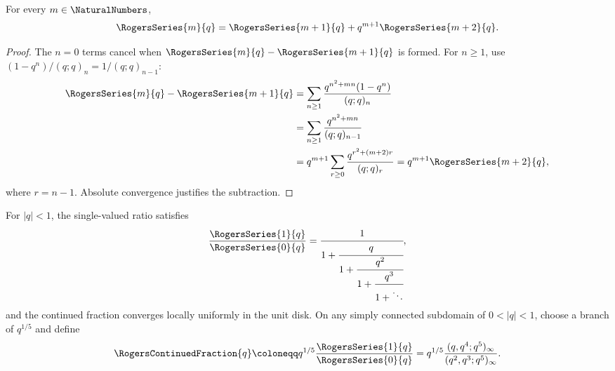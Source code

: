 \begin{lemma}
\label{qg:lem-rogers-recurrence}
For every \(m\in\NaturalNumbers\),
\begin{equation}
  \RogersSeries{m}{q}
  =\RogersSeries{m+1}{q}+q^{m+1}\RogersSeries{m+2}{q}.
  \label{qg:eq:rogers-recurrence}
\end{equation}
\end{lemma}

\begin{proof}
The \(n=0\) terms cancel when
\(\RogersSeries{m}{q}-\RogersSeries{m+1}{q}\) is formed.  For
\(n\ge1\), use
\((1-q^n)/(q;q)_n=1/(q;q)_{n-1}\):
\begin{align*}
 \RogersSeries{m}{q}-\RogersSeries{m+1}{q}
 &=\sum_{n\ge1}
   \frac{q^{n^2+mn}(1-q^n)}{(q;q)_n}\\
 &=\sum_{n\ge1}\frac{q^{n^2+mn}}{(q;q)_{n-1}}\\
 &=q^{m+1}\sum_{r\ge0}
   \frac{q^{r^2+(m+2)r}}{(q;q)_r}
 =q^{m+1}\RogersSeries{m+2}{q},
\end{align*}
where \(r=n-1\).  Absolute convergence justifies the subtraction.
\end{proof}

\begin{theorem}
\label{qg:thm-rrcf}
For \(|q|<1\), the single-valued ratio satisfies
\begin{equation}
 \frac{\RogersSeries{1}{q}}{\RogersSeries{0}{q}}
 =
 \cfrac{1}{
  1+\cfrac{q}{
  1+\cfrac{q^2}{
  1+\cfrac{q^3}{1+\ddots}}}},
 \label{qg:eq:rogers-ramanujan-fraction}
\end{equation}
and the continued fraction converges locally uniformly in the unit disk.
On any simply connected subdomain of \(0<|q|<1\), choose a branch of
\(q^{1/5}\) and define
\begin{equation}
 \RogersContinuedFraction{q}
 \coloneqq q^{1/5}
 \frac{\RogersSeries{1}{q}}{\RogersSeries{0}{q}}
 =
 q^{1/5}
 \frac{(q,q^4;q^5)_\infty}
      {(q^2,q^3;q^5)_\infty}.
 \label{qg:eq:rogers-ramanujan-fraction-product}
\end{equation}
\end{theorem}


